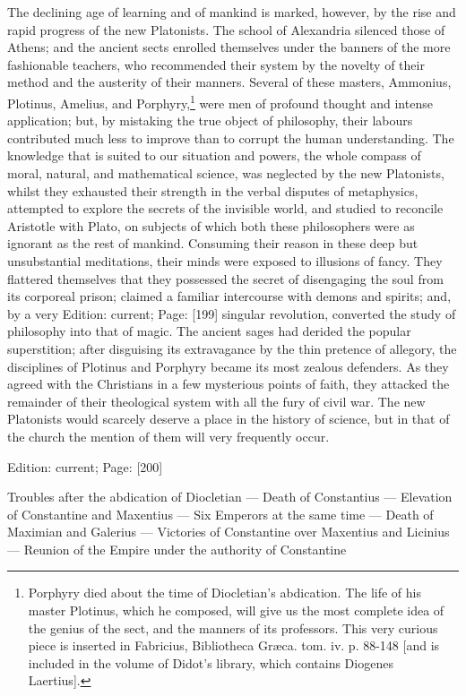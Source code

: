 The declining age of learning and of mankind is marked, however, by the rise and rapid progress of the new Platonists. The school of Alexandria silenced those of Athens; and the ancient sects enrolled themselves under the banners of the more fashionable teachers, who recommended their system by the novelty of their method and the austerity of their manners. Several of these masters, Ammonius, Plotinus, Amelius, and Porphyry,\footnote{Porphyry died about the time of Diocletian\texthebrew{}’s abdication. The life of his master Plotinus, which he composed, will give us the most complete idea of the genius of the sect, and the manners of its professors. This very curious piece is inserted in Fabricius, Bibliotheca Græca. tom. iv. p. 88-148 [and is included in the volume of Didot\texthebrew{}’s library, which contains Diogenes Laertius].} were men of profound thought and intense application; but, by mistaking the true object of philosophy, their labours contributed much less to improve than to corrupt the human understanding. The knowledge that is suited to our situation and powers, the whole compass of moral, natural, and mathematical science, was neglected by the new Platonists, whilst they exhausted their strength in the verbal disputes of metaphysics, attempted to explore the secrets of the invisible world, and studied to reconcile Aristotle with Plato, on subjects of which both these philosophers were as ignorant as the rest of mankind. Consuming their reason in these deep but unsubstantial meditations, their minds were exposed to illusions of fancy. They flattered themselves that they possessed the secret of disengaging the soul from its corporeal prison; claimed a familiar intercourse with demons and spirits; and, by a very Edition: current; Page: [199] singular revolution, converted the study of philosophy into that of magic. The ancient sages had derided the popular superstition; after disguising its extravagance by the thin pretence of allegory, the disciplines of Plotinus and Porphyry became its most zealous defenders. As they agreed with the Christians in a few mysterious points of faith, they attacked the remainder of their theological system with all the fury of civil war. The new Platonists would scarcely deserve a place in the history of science, but in that of the church the mention of them will very frequently occur.

Edition: current; Page: [200]


Troubles after the abdication of Diocletian \texthebrew{—} Death of Constantius \texthebrew{—} Elevation of Constantine and Maxentius \texthebrew{—} Six Emperors at the same time \texthebrew{—} Death of Maximian and Galerius \texthebrew{—} Victories of Constantine over Maxentius and Licinius \texthebrew{—} Reunion of the Empire under the authority of Constantine

